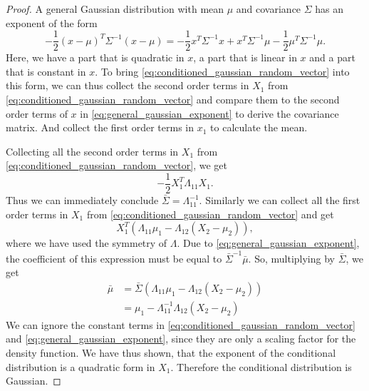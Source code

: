 \begin{proof}
    A general Gaussian distribution with mean $\mu$ and covariance $\Sigma$ has an exponent of the form
    \begin{equation}\label{eq:general_gaussian_exponent}
        -\frac{1}{2} (x-\mu)^{T} \Sigma^{-1} (x-\mu) = -\frac{1}{2} x^{T} \Sigma^{-1} x + x^{T} \Sigma^{-1} \mu - \frac{1}{2} \mu^{T} \Sigma^{-1} \mu.
    \end{equation}
    Here, we have a part that is quadratic in $x$, a part that is linear in $x$ and a part that is constant in $x$.
    To bring \eqref{eq:conditioned_gaussian_random_vector} into this form, we can thus collect the second order terms in $X_{1}$ from \eqref{eq:conditioned_gaussian_random_vector} and compare them to the second order terms of $x$ in \eqref{eq:general_gaussian_exponent} to derive the covariance matrix. And collect the first order terms in $x_{1}$ to calculate the mean.
    
    Collecting all the second order terms in $X_{1}$ from \eqref{eq:conditioned_gaussian_random_vector}, we get
    \[
        -\frac{1}{2} X_{1}^{T} \Lambda_{11} X_{1}.
    \]
    Thus we can immediately conclude \( \bar{ \Sigma} = \Lambda_{11}^{-1} \).
    Similarly we can collect all the first order terms in $X_{1}$ from \eqref{eq:conditioned_gaussian_random_vector} and get
    \[
        X_{1}^{T}(\Lambda_{11}\mu_{1}-\Lambda_{12}(X_{2}-\mu_{2})),
    \]
    where we have used the symmetry of $\Lambda$.
    Due to \eqref{eq:general_gaussian_exponent}, the coefficient of this expression must be equal to $\bar{\Sigma}^{-1} \bar{\mu}$.
    So, multiplying by \( \bar{\Sigma} \), we get
    \begin{align*}
        \bar{\mu} &= \bar{\Sigma}(\Lambda_{11}\mu_{1}-\Lambda_{12}(X_{2}-\mu_{2})) \\
        &= \mu_{1} - \Lambda_{11}^{-1}\Lambda_{12}(X_{2}-\mu_{2}) 
    \end{align*}
    We can ignore the constant terms in \eqref{eq:conditioned_gaussian_random_vector} and \eqref{eq:general_gaussian_exponent}, since they are only a scaling factor for the density function. We have thus shown, that the exponent of the conditional distribution is a quadratic form in $X_{1}$. Therefore the conditional distribution is Gaussian.
        

\end{proof}
